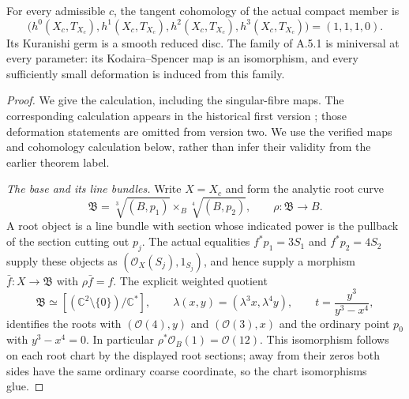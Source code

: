 \begin{theorem}[A.5.2; Proved]\label{st:A.5.2}
For every admissible $c$, the tangent cohomology of the actual compact
member is
\[
 \bigl(h^0(X_c,T_{X_c}),h^1(X_c,T_{X_c}),h^2(X_c,T_{X_c}),
 h^3(X_c,T_{X_c})\bigr)=(1,1,1,0).
\]
Its Kuranishi germ is a smooth reduced disc. The family of A.5.1 is
miniversal at every parameter: its Kodaira--Spencer map is an isomorphism,
and every sufficiently small deformation is induced from this family.
\end{theorem}
\begin{proof}
We give the calculation, including the singular-fibre maps. The
corresponding calculation appears in the historical first version
\cite[Section 6, especially Proposition 6.10, Lemma 6.11,
Theorem 6.12 and Proposition 6.16]{DGKX26v1}; those deformation
statements are omitted from version two. We use the verified maps and
cohomology calculation below, rather than infer their validity from the
earlier theorem label.

\emph{The base and its line bundles.}
Write $X=X_c$ and form the analytic root curve
\[
 \mathfrak B=\sqrt[3]{(B,p_1)}\mathbin{\times_B}\sqrt[4]{(B,p_2)},
 \qquad \rho:\mathfrak B\longrightarrow B.
\]
A root object is a line bundle with section whose indicated power is the
pullback of the section cutting out $p_j$. The actual equalities
$f^*p_1=3S_1$ and $f^*p_2=4S_2$ supply these objects as
$(\mathcal O_X(S_j),1_{S_j})$, and hence supply a morphism
$\bar f:X\to\mathfrak B$ with $\rho\bar f=f$.
The explicit weighted quotient
\[
 \mathfrak B\simeq[(\mathbb C^2\setminus\{0\})/\mathbb C^*],
 \qquad \lambda(x,y)=(\lambda^3x,\lambda^4y),
 \qquad t=\frac{y^3}{y^3-x^4},
\]
identifies the roots with $(\mathcal O(4),y)$ and
$(\mathcal O(3),x)$ and the ordinary point $p_0$ with
$y^3-x^4=0$. In particular $\rho^*\mathcal O_B(1)=\mathcal O(12)$.
This isomorphism follows on each root chart by the displayed root
sections; away from their zeros both sides have the same ordinary coarse
coordinate, so the chart isomorphisms glue.


\end{proof}
